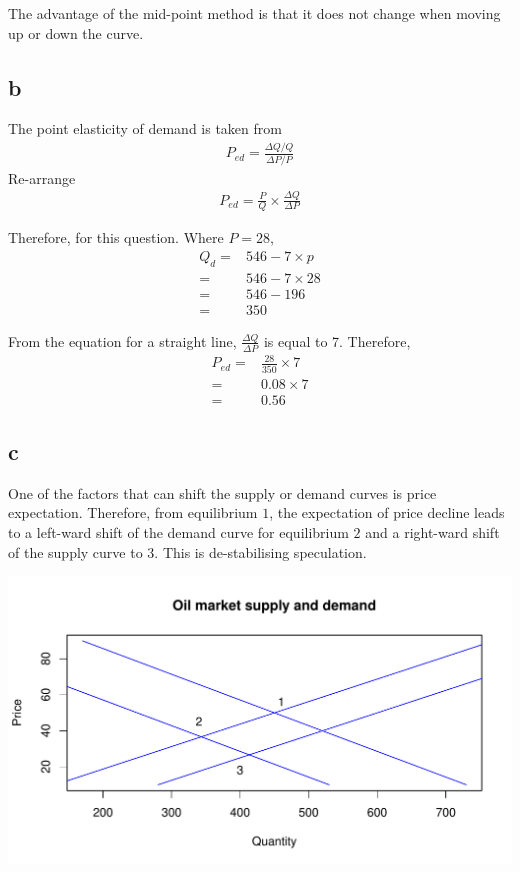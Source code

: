 \documentclass[12pt, a4paper, oneside]{article}\usepackage[]{graphicx}\usepackage[]{color}
\makeatletter
\def\maxwidth{ %
  \ifdim\Gin@nat@width>\linewidth
    \linewidth
  \else
    \Gin@nat@width
  \fi
}
\newenvironment{knitrout}{}{} %
\makeatother
\begin{document}
The advantage of the mid-point method is that it does not change when moving up or down the curve.  

\subsection*{b}
The point elasticity of demand is taken from  
\begin{align*}
P_{ed} = \frac{\Delta Q/Q}{\Delta P /P}
\end{align*}
Re-arrange
\begin{align*}
P_{ed} = \frac{P}{Q} \times \frac{\Delta Q}{\Delta P}
\end{align*}

Therefore, for this question. Where $P = 28$, 
\begin{align*}
Q_d =& 546 - 7 \times p\\
 =& 546 - 7 \times 28\\
=& 546 - 196\\
=& 350
\end{align*}


From the equation for a straight line, $\frac{\Delta Q}{\Delta P}$ is equal to 7. 
Therefore, 
\begin{align*}
P_{ed} =& \frac{28}{350} \times 7\\
=& 0.08 \times 7\\
=& 0.56
\end{align*}


\subsection*{c}
One of the factors that can shift the supply or demand curves is price expectation. Therefore, from equilibrium $1$, the expectation of price decline leads to a left-ward shift of the demand curve for equilibrium $2$ and a right-ward shift of the supply curve to $3$.  This is de-stabilising speculation.

\begin{knitrout}
\color{fgcolor}
\includegraphics[width=\maxwidth]{figure/speculation} 

\end{knitrout}
\end{document}
